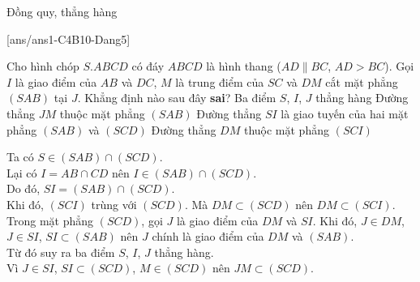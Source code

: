 \begin{dang}{Đồng quy, thẳng hàng}
\end{dang}
[ans/ans1-C4B10-Dang5]
\begin{ex}%
Cho hình chóp $S.ABCD$ có đáy $ABCD$ là hình thang ($AD\parallel BC$, $AD>BC$). Gọi $I$ là giao điểm của $AB$ và $DC$, $M$ là trung điểm của $SC$ và $DM$ cắt mặt phẳng $(SAB)$ tại $J$. Khẳng định nào sau đây \textbf{sai}?
\choice
{Ba điểm $S$, $I$, $J$ thẳng hàng}
{\True Đường thẳng $JM$ thuộc mặt phẳng $(SAB)$}
{Đường thẳng $SI$ là giao tuyến của hai mặt phẳng $(SAB)$ và $(SCD)$}
{Đường thẳng $DM$ thuộc mặt phẳng $(SCI)$}
\loigiai
{
\immini
{
Ta có $S\in (SAB)\cap (SCD)$.\\
Lại có $I=AB\cap CD$ nên $I\in (SAB)\cap (SCD)$.\\
Do đó, $SI=(SAB)\cap (SCD)$.\\
Khi đó, $(SCI)$ trùng với $(SCD)$. Mà $DM\subset (SCD)$ nên $DM\subset (SCI)$.\\
Trong mặt phẳng $(SCD)$, gọi $J$ là giao điểm của $DM$ và $SI$. Khi đó, $J\in DM$, $J\in SI$, $SI\subset (SAB)$ nên $J$ chính là giao điểm của $DM$ và $(SAB)$.\\
Từ đó suy ra ba điểm $S$, $I$, $J$ thẳng hàng.\\
Vì $J\in SI$, $SI\subset (SCD)$, $M\in (SCD)$ nên $JM\subset (SCD)$.
}
{
}
}
\end{ex}

